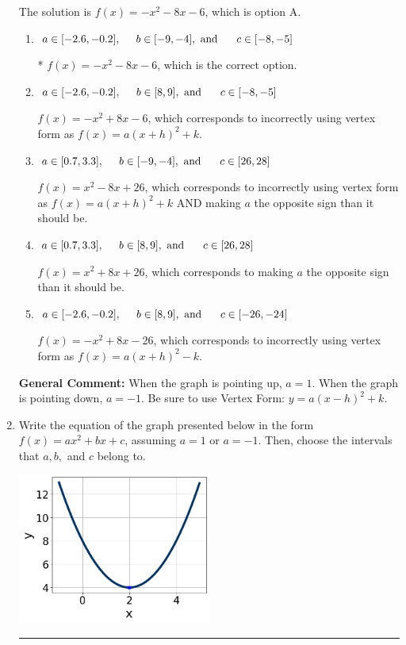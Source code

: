 \documentclass{extbook}[14pt]
\newcommand{\litem}[1]{\item #1

\rule{\textwidth}{0.4pt}}
\begin{document}
\begin{enumerate}
{The solution is \( f(x) = -x^{2} -8 x -6 \), which is option A.\begin{enumerate}[label=\Alph*.]
\item \( a \in [-2.6, -0.2], \hspace*{5mm} b \in [-9, -4], \text{ and } \hspace*{5mm} c \in [-8, -5] \)

* $f(x)=-x^{2} -8 x -6$, which is the correct option.
\item \( a \in [-2.6, -0.2], \hspace*{5mm} b \in [8, 9], \text{ and } \hspace*{5mm} c \in [-8, -5] \)

$f(x)=-x^{2} +8 x -6$, which corresponds to incorrectly using vertex form as $f(x) = a(x+h)^2+k$.
\item \( a \in [0.7, 3.3], \hspace*{5mm} b \in [-9, -4], \text{ and } \hspace*{5mm} c \in [26, 28] \)

$f(x)=x^{2} -8 x + 26$, which corresponds to incorrectly using vertex form as $f(x) = a(x+h)^2+k$ AND making $a$ the opposite sign than it should be.
\item \( a \in [0.7, 3.3], \hspace*{5mm} b \in [8, 9], \text{ and } \hspace*{5mm} c \in [26, 28] \)

$f(x)=x^{2} +8 x + 26$, which corresponds to making $a$ the opposite sign than it should be.
\item \( a \in [-2.6, -0.2], \hspace*{5mm} b \in [8, 9], \text{ and } \hspace*{5mm} c \in [-26, -24] \)

$f(x)=-x^{2} +8 x -26$, which corresponds to incorrectly using vertex form as $f(x) = a(x+h)^2 - k$.
\end{enumerate}

\textbf{General Comment:} When the graph is pointing up, $a=1$. When the graph is pointing down, $a=-1$. Be sure to use Vertex Form: $y = a(x-h)^2+k$.
}
\litem{
Write the equation of the graph presented below in the form $f(x)=ax^2+bx+c$, assuming  $a=1$ or $a=-1$. Then, choose the intervals that $a, b,$ and $c$ belong to.

\begin{center}
    \includegraphics[width=0.5\textwidth]{../Figures/quadraticGraphToEquationA.png}
\end{center}


}
\end{enumerate}
\end{document}
